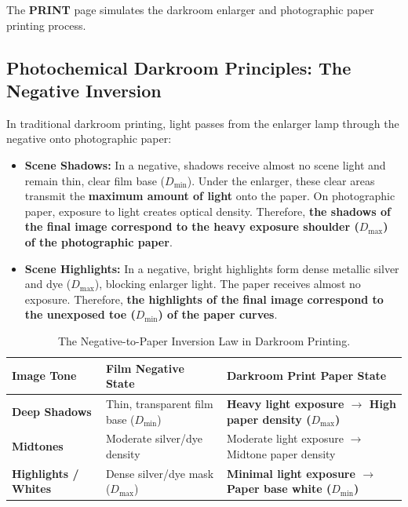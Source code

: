\documentclass[11pt,a4paper]{article}
\begin{document}
The \textbf{PRINT} page simulates the darkroom enlarger and photographic paper printing process.

\subsection{Photochemical Darkroom Principles: The Negative Inversion}
In traditional darkroom printing, light passes from the enlarger lamp through the negative onto photographic paper:
\begin{itemize}[leftmargin=*]
    \item \textbf{Scene Shadows:} In a negative, shadows receive almost no scene light and remain thin, clear film base ($D_{\min}$). Under the enlarger, these clear areas transmit the \textbf{maximum amount of light} onto the paper. On photographic paper, exposure to light creates optical density. Therefore, \textbf{the shadows of the final image correspond to the heavy exposure shoulder ($D_{\max}$) of the photographic paper}.
    \item \textbf{Scene Highlights:} In a negative, bright highlights form dense metallic silver and dye ($D_{\max}$), blocking enlarger light. The paper receives almost no exposure. Therefore, \textbf{the highlights of the final image correspond to the unexposed toe ($D_{\min}$) of the paper curves}.
\end{itemize}

\begin{table}[h]
\centering
\small
\begin{tabularx}{\textwidth}{lll}
\toprule
\textbf{Image Tone} & \textbf{Film Negative State} & \textbf{Darkroom Print Paper State} \\
\midrule
\textbf{Deep Shadows} & Thin, transparent film base ($D_{\min}$) & \textbf{Heavy light exposure $\longrightarrow$ High paper density ($D_{\max}$)} \\
\textbf{Midtones} & Moderate silver/dye density & Moderate light exposure $\longrightarrow$ Midtone paper density \\
\textbf{Highlights / Whites} & Dense silver/dye mask ($D_{\max}$) & \textbf{Minimal light exposure $\longrightarrow$ Paper base white ($D_{\min}$)} \\
\bottomrule
\end{tabularx}
\caption{The Negative-to-Paper Inversion Law in Darkroom Printing.}
\end{table}

\newpage

\end{document}
